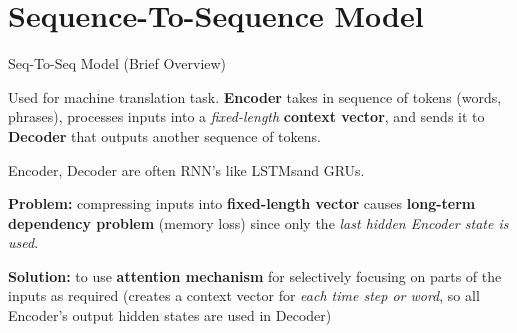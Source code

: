 

\section{Sequence-To-Sequence Model}


\begin{frame}{Seq-To-Seq Model (Brief Overview)}
\normalsize 
    \begin{itemizeSpaced}{7pt}
        \item Used for machine translation task. \textbf{Encoder} takes in sequence of tokens (words, phrases), processes inputs into a \emph{fixed-length} \textbf{context vector}, and sends it to \textbf{Decoder} that outputs another sequence of tokens. 
        
        \item Encoder, Decoder are often RNN's \footnotemark like LSTMs\footnotemark and GRUs\footnotemark. 
        
        \item \textbf{Problem: } compressing inputs into \textbf{fixed-length vector} causes \textbf{long-term dependency problem} (memory loss) since only the \emph{last hidden Encoder state is used}. 
        
        \item \textbf{Solution: }to use \textbf{attention mechanism} for selectively focusing on parts of the inputs as required (creates a context vector for \emph{each time step or word}, so all Encoder's output hidden states are used in Decoder)
        
        
    \end{itemizeSpaced}
    
    
    
    
\end{frame}